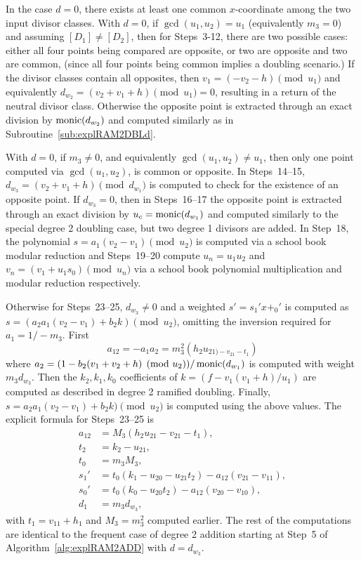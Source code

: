 In the case $d = 0$, there exists at least one common $x$-coordinate among the
two input divisor classes. With $d=0$, if $\gcd(u_1,u_2) = u_1$ (equivalently
$m_3 = 0$) and assuming $[D_1] \not = [D_2]$, then for Steps~3-12, there are two
possible cases: either all four points being compared are opposite, or two are
opposite and two are common, (since all four points being common implies a
doubling scenario.) If the divisor classes contain all opposites, then $v_1 =
(-v_2 -h) \pmod{u_1}$ and equivalently $d_{w_2} = (v_2 + v_1 + h) \pmod{u_1} =
0$, resulting in a return of the neutral divisor class. Otherwise the opposite
point is extracted through an exact division by $\operatorname{monic}(d_{w_2})$ and computed
similarly as in Subroutine~\ref{sub:explRAM2DBLd}.

With $d=0$, if $m_3 \neq 0$, and equivalently $\gcd(u_1,u_2) \neq u_1$, then
only one point computed via $\gcd(u_1,u_2)$, is common or opposite. In
Steps~14--15, $d_{w_3} = (v_2 + v_1 + h) \pmod{d_{w_1}}$ is computed to check
for the existence of an opposite point. If $d_{w_3} = 0$, then in Steps~16--17
the opposite point is extracted through an exact division by $u_c =
\operatorname{monic}(d_{w_1})$ and computed similarly to the special degree 2 doubling case,
but two degree 1 divisors are added. In Step~18, the polynomial $s = a_1(v_2 -
v_1) \pmod{u_2}$ is computed via a school book modular reduction and
Steps~19--20 compute $u_n = u_1u_2$ and $v_n = (v_1 + u_1s_0) \pmod{u_n}$  via a
school book polynomial multiplication and modular reduction respectively. 

Otherwise for Steps~23--25, $d_{w_3} \neq 0$ and  a weighted $s' = s_1'x + _0'$
is computed as $s = (a_2a_1(v_2 - v_1) + b_2k) \pmod{u_2}$, omitting the
inversion required for $a_1 = 1/-m_3$. First
$$a_{12} = -a_1a_2 = m_3^2(h_2u_{21) - v_{21} - t_1})$$ where $a_2 = (1 -
b_2(v_1 + v_2 + h) \pmod{u_2})/\operatorname{monic}(d_{w_1})$ is computed with weight
$m_3d_{w_3}$. Then the $k_2,k_1,k_0$ coefficients of $k = (f - v_1(v_1 +
h)/u_1)$ are computed as described in degree 2 ramified doubling. Finally, $s =
a_2a_1(v_2 - v_1)+ b_2k) \pmod{u_2}$ is computed using the above values. The
explicit formula for Steps~23--25 is
\begin{align*}
    a_{12} &= M_3(h_2u_{21} - v_{21} - t_1),\\   
    t_2 &= k_2 - u_{21},\\
    t_0 &= m_3M_3,\\
    s_1' &= t_0(k_1 - u_{20} - u_{21}t_2) - a_{12}(v_{21} - v_{11}),\\
    s_0' &= t_0(k_0 - u_{20}t_2) - a_{12}(v_{20} - v_{10}),\\
    d_1 &= m_3d_{w_3},
\end{align*} with $t_1 = v_{11} + h_1$ and $M_3 = m_3^2$ computed earlier. The 
rest of the computations are identical to the frequent case of degree 2 addition
starting at Step~5 of Algorithm~\ref{alg:explRAM2ADD} with $d = d_{w_3}$.

